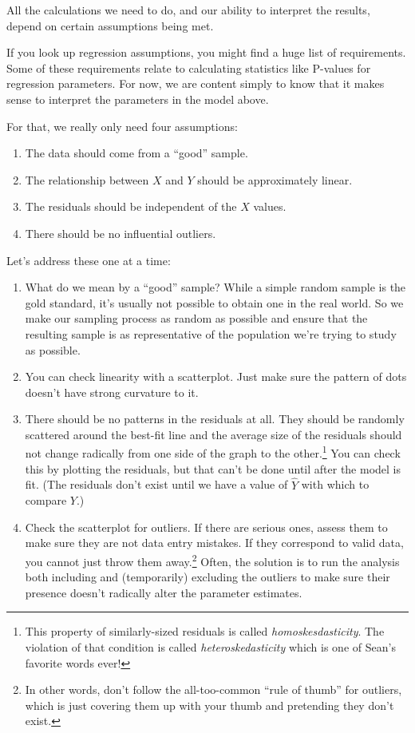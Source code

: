 \documentclass[
]{book}
\providecommand{\tightlist}{%
  \setlength{\itemsep}{0pt}\setlength{\parskip}{0pt}}
\begin{document}
All the calculations we need to do, and our ability to interpret the results, depend on certain assumptions being met.

If you look up regression assumptions, you might find a huge list of requirements. Some of these requirements relate to calculating statistics like P-values for regression parameters. For now, we are content simply to know that it makes sense to interpret the parameters in the model above.

For that, we really only need four assumptions:

\begin{enumerate}
\def\labelenumi{\arabic{enumi}.}
\tightlist
\item
  The data should come from a ``good'' sample.
\item
  The relationship between \(X\) and \(Y\) should be approximately linear.
\item
  The residuals should be independent of the \(X\) values.
\item
  There should be no influential outliers.
\end{enumerate}

Let's address these one at a time:

\begin{enumerate}
\def\labelenumi{\arabic{enumi}.}
\tightlist
\item
  What do we mean by a ``good'' sample? While a simple random sample is the gold standard, it's usually not possible to obtain one in the real world. So we make our sampling process as random as possible and ensure that the resulting sample is as representative of the population we're trying to study as possible.
\item
  You can check linearity with a scatterplot. Just make sure the pattern of dots doesn't have strong curvature to it.
\item
  There should be no patterns in the residuals at all. They should be randomly scattered around the best-fit line and the average size of the residuals should not change radically from one side of the graph to the other.\footnote{This property of similarly-sized residuals is called \emph{homoskesdasticity}. The violation of that condition is called \emph{heteroskedasticity} which is one of Sean's favorite words ever!} You can check this by plotting the residuals, but that can't be done until after the model is fit. (The residuals don't exist until we have a value of \(\hat{Y}\) with which to compare \(Y\).)
\item
  Check the scatterplot for outliers. If there are serious ones, assess them to make sure they are not data entry mistakes. If they correspond to valid data, you cannot just throw them away.\footnote{In other words, don't follow the all-too-common ``rule of thumb'' for outliers, which is just covering them up with your thumb and pretending they don't exist.} Often, the solution is to run the analysis both including and (temporarily) excluding the outliers to make sure their presence doesn't radically alter the parameter estimates.
\end{enumerate}
\end{document}
